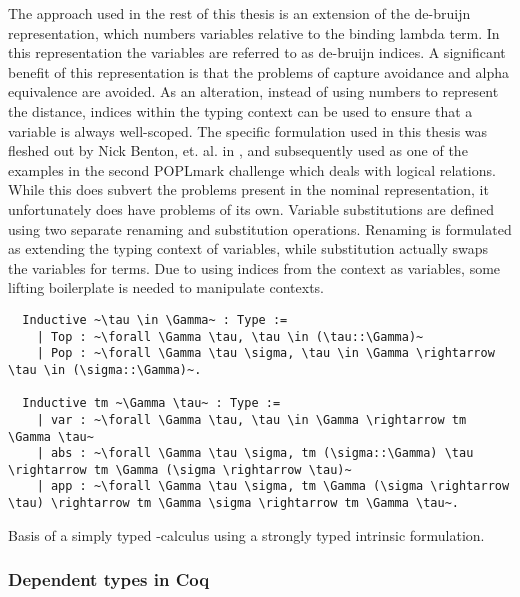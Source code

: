 \documentclass[a4, 12pt, final]{article}
\begin{document}
The approach used in the rest of this thesis is an extension of the de-bruijn representation, which numbers variables relative to the binding lambda term.
In this representation the variables are referred to as de-bruijn indices.
A significant benefit of this representation is that the problems of capture avoidance and alpha equivalence are avoided.
As an alteration, instead of using numbers to represent the distance, indices within the typing context can be used to ensure that a variable is always well-scoped.
The specific formulation used in this thesis was fleshed out by Nick Benton, et. al. in \cite{Benton2011}, and subsequently used as one of the examples in the second POPLmark challenge which deals with logical relations\cite{poplmark_reloaded}.
While this does subvert the problems present in the nominal representation, it unfortunately does have problems of its own.
Variable substitutions are defined using two separate renaming and substitution operations.
Renaming is formulated as extending the typing context of variables, while substitution actually swaps the variables for terms.
Due to using indices from the context as variables, some lifting boilerplate is needed to manipulate contexts.

\begin{listing}
  \begin{verbatim}
  Inductive ~\tau \in \Gamma~ : Type :=
    | Top : ~\forall \Gamma \tau, \tau \in (\tau::\Gamma)~
    | Pop : ~\forall \Gamma \tau \sigma, \tau \in \Gamma \rightarrow \tau \in (\sigma::\Gamma)~.

  Inductive tm ~\Gamma \tau~ : Type :=
    | var : ~\forall \Gamma \tau, \tau \in \Gamma \rightarrow tm \Gamma \tau~
    | abs : ~\forall \Gamma \tau \sigma, tm (\sigma::\Gamma) \tau \rightarrow tm \Gamma (\sigma \rightarrow \tau)~
    | app : ~\forall \Gamma \tau \sigma, tm \Gamma (\sigma \rightarrow \tau) \rightarrow tm \Gamma \sigma \rightarrow tm \Gamma \tau~.
  \end{verbatim}
  \caption{Basis of a simply typed \lambda-calculus using a strongly typed intrinsic formulation.}
  \label{lst:strong_stlc}
\end{listing}

\subsubsection{Dependent types in Coq}
\end{document}
